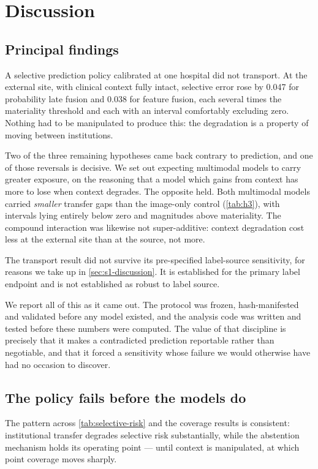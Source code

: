 \section{Discussion}
\label{sec:discussion}

\subsection{Principal findings}

A selective prediction policy calibrated at one hospital did not transport. At
the external site, with clinical context fully intact, selective error rose by
\num{0.047} for probability late fusion and \num{0.038} for feature fusion,
each several times the materiality threshold and each with an interval
comfortably excluding zero. Nothing had to be manipulated to produce this: the
degradation is a property of moving between institutions.

Two of the three remaining hypotheses came back contrary to prediction, and one
of those reversals is decisive. We set out expecting multimodal models to carry
greater exposure, on the reasoning that a model which gains from context has
more to lose when context degrades. The opposite held. Both multimodal models
carried \emph{smaller} transfer gaps than the image-only control
(\cref{tab:h3}), with intervals lying entirely below zero and magnitudes above
materiality. The compound interaction was likewise not super-additive: context
degradation cost less at the external site than at the source, not more.

The transport result did not survive its pre-specified label-source
sensitivity, for reasons we take up in \cref{sec:s1-discussion}. It is
established for the primary label endpoint and is not established as robust to
label source.

We report all of this as it came out. The protocol was frozen, hash-manifested
and validated before any model existed, and the analysis code was written and
tested before these numbers were computed. The value of that discipline is
precisely that it makes a contradicted prediction reportable rather than
negotiable, and that it forced a sensitivity whose failure we would otherwise
have had no occasion to discover.

\subsection{The policy fails before the models do}

The pattern across \cref{tab:selective-risk} and the coverage results is
consistent: institutional transfer degrades selective risk substantially, while
the abstention mechanism holds its operating point --- until context is
manipulated, at which point coverage moves sharply.

